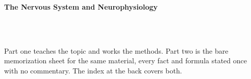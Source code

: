 



\makeindex[title={Index of This Volume},columns=2,intoc]

\begin{titlepage}\thispagestyle{empty}
\vspace*{0.14\textheight}
\noindent{\color{tiercore}\rule{\textwidth}{5pt}}\\[3pt]
\noindent{\color{bioline}\rule{\textwidth}{1pt}}\\[26pt]
\\[12pt]
\noindent\begin{minipage}{\textwidth}\raggedright
{\sffamily\bfseries\fontsize{28}{32}\selectfont\color{bioink}%
 \hyphenchar{} The Nervous System and Neurophysiology\par}\end{minipage}\\[16pt]
\noindent{\color{biogreen}\rule{\textwidth}{1.4pt}}\\[10pt]
\noindent\begin{minipage}{\textwidth}\raggedright
{\fontsize{10.5}{14}\selectfont\color{biogreen}%
Part one teaches the topic and works the methods. Part two is the bare memorization sheet for the
same material, every fact and formula stated once with no commentary. The index at the back covers both.\par}\end{minipage}
\vfill
\noindent{\color{bioline}\rule{\textwidth}{1pt}}\\[3pt]
\noindent{\color{tiercore}\rule{\textwidth}{5pt}}
\end{titlepage}
\tableofcontents
\clearpage
{}
\clearpage
\printindex

